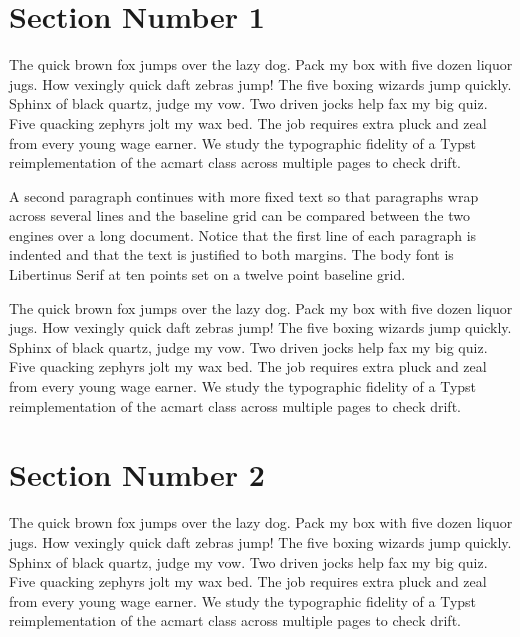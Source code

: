 \documentclass[acmsmall,nonacm]{acmart}
\begin{document}
\thispagestyle{empty}%
\section{Section Number 1}
The quick brown fox jumps over the lazy dog. Pack my box with five dozen liquor jugs. How vexingly quick daft zebras jump! The five boxing wizards jump quickly. Sphinx of black quartz, judge my vow. Two driven jocks help fax my big quiz. Five quacking zephyrs jolt my wax bed. The job requires extra pluck and zeal from every young wage earner. We study the typographic fidelity of a Typst reimplementation of the acmart class across multiple pages to check drift.

A second paragraph continues with more fixed text so that paragraphs wrap across several lines and the baseline grid can be compared between the two engines over a long document. Notice that the first line of each paragraph is indented and that the text is justified to both margins. The body font is Libertinus Serif at ten points set on a twelve point baseline grid.

The quick brown fox jumps over the lazy dog. Pack my box with five dozen liquor jugs. How vexingly quick daft zebras jump! The five boxing wizards jump quickly. Sphinx of black quartz, judge my vow. Two driven jocks help fax my big quiz. Five quacking zephyrs jolt my wax bed. The job requires extra pluck and zeal from every young wage earner. We study the typographic fidelity of a Typst reimplementation of the acmart class across multiple pages to check drift.

\section{Section Number 2}
The quick brown fox jumps over the lazy dog. Pack my box with five dozen liquor jugs. How vexingly quick daft zebras jump! The five boxing wizards jump quickly. Sphinx of black quartz, judge my vow. Two driven jocks help fax my big quiz. Five quacking zephyrs jolt my wax bed. The job requires extra pluck and zeal from every young wage earner. We study the typographic fidelity of a Typst reimplementation of the acmart class across multiple pages to check drift.
\end{document}
